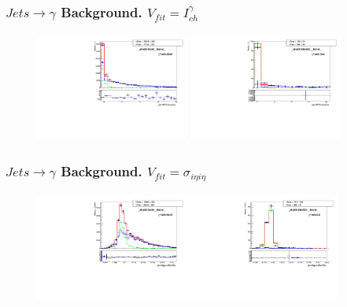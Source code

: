 \begin{frame}\frametitle{$Jets \rightarrow \gamma$ Background. $V_{fit}=I_{ch}^{\gamma}$}
  \begin{figure}[htb]
    \begin{center}
       \includegraphics[width=0.45\textwidth]{../figs/figs_v11/MUON_WGamma/TemplateFits/c_TEMPL_CHISO_UNblind__phoEt15to20__Barrel__RooFit.pdf} \includegraphics[width=0.45\textwidth]{../figs/figs_v11/MUON_WGamma/TemplateFits/c_TEMPL_CHISO_UNblind__phoEt120to500__Barrel__RooFit.pdf}
    \end{center}
  \end{figure}
\end{frame}%


\begin{frame}\frametitle{$Jets \rightarrow \gamma$ Background. $V_{fit}=\sigma_{i\eta{i\eta}}$}
  \begin{figure}[htb]
    \begin{center}
       \includegraphics[width=0.45\textwidth]{../figs/figs_v11/MUON_WGamma/TemplateFits/c_TEMPL_SIHIH_UNblind__phoEt15to20__Barrel__RooFit.pdf}\includegraphics[width=0.45\textwidth]{../figs/figs_v11/MUON_WGamma/TemplateFits/c_TEMPL_SIHIH_UNblind__phoEt120to500__Barrel__RooFit.pdf}
    \end{center}
  \end{figure}
\end{frame}%

